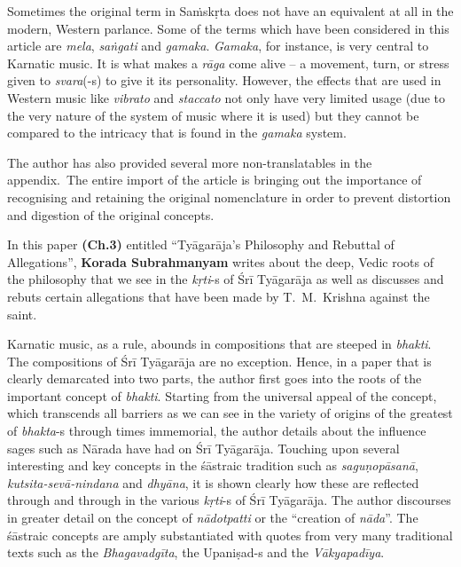 Sometimes the original term in Saṁskṛta does not have an equivalent at all in the modern, Western parlance. Some of the terms which have been considered in this article are \textit{mela}, \textit{saṅgati} and \textit{gamaka}. \textit{Gamaka}, for instance, is very central to Karnatic music. It is what makes a \textit{rāga} come alive – a movement, turn, or stress given to \textit{svara}(-s) to give it its personality. However, the effects that are used in Western music like \textit{vibrato} and \textit{staccato} not only have very limited usage (due to the very nature of the system of music where it is used) but they cannot be compared to the intricacy that is found in the \textit{gamaka} system.

The author has also provided several more non-translatables in the appendix.~The entire import of the article is bringing out the importance of recognising and retaining the original nomenclature in order to prevent distortion and digestion of the original concepts.

In this paper \textbf{(Ch.3)} entitled “Tyāgarāja’s Philosophy and Rebuttal of Allegations”, \textbf{Korada Subrahmanyam} writes about the deep, Vedic roots of the philosophy that we see in the \textit{kṛti}-s of Śrī Tyāgarāja as well as discusses and rebuts certain allegations that have been made by T.~M.~Krishna against the saint.

Karnatic music, as a rule, abounds in compositions that are steeped in \textit{bhakti}. The compositions of Śrī Tyāgarāja are no exception. Hence, in a paper that is clearly demarcated into two parts, the author first goes into the roots of the important concept of \textit{bhakti}. Starting from the universal appeal of the concept, which transcends all barriers as we can see in the variety of origins of the greatest of \textit{bhakta}-s through times immemorial, the author details about the influence sages such as Nārada have had on Śrī Tyāgarāja. Touching upon several interesting and key concepts in the śāstraic tradition such as \textit{saguṇopāsanā}, \textit{kutsita-sevā-nindana} and \textit{dhyāna}, it is shown clearly how these are reflected through and through in the various \textit{kṛti}-s of Śrī Tyāgarāja. The author discourses in greater detail on the concept of \textit{nādotpatti} or the “creation of \textit{nāda}”. The śāstraic concepts are amply substantiated with quotes from very many traditional texts such as the \textit{Bhagavadgīta}, the Upaniṣad-s and the \textit{Vākyapadīya}.

